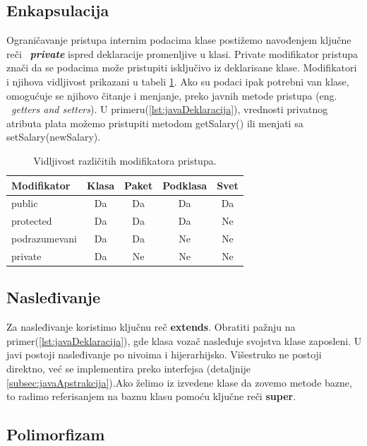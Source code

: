 \documentclass[a4paper]{article}
\begin{document}
{\subsection{Enkapsulacija}
\label{subsec:javaEnkapsulacija}

Ograničavanje pristupa internim podacima klase postižemo navođenjem ključne reči ~{\em \textbf{private}} ispred deklaracije promenljive u klasi. Private modifikator pristupa znači da se podacima može pristupiti isključivo iz deklarisane klase. Modifikatori i njihova vidljivost prikazani u tabeli \ref{tab:tabelaModPristupa}. Ako su podaci ipak potrebni van klase, omogućuje se njihovo čitanje i menjanje, preko javnih metode pristupa (eng. ~{\em getters and setters})\cite{horstmann2017core}. U primeru(\ref{lst:javaDeklaracija}), vrednosti privatnog atributa plata možemo pristupiti metodom getSalary() ili menjati sa setSalary(newSalary).

\begin{table}[h!]
\begin{center}
\caption{Vidljivost različitih modifikatora pristupa.}
\begin{tabular}{|l|c|c|c|c|} \hline
Modifikator &Klasa &Paket &Podklasa &Svet\\ \hline
public &Da &Da &Da &Da\\ \hline
protected &Da &Da &Da &Ne\\ \hline
podrazumevani &Da &Da &Ne &Ne\\ \hline
private &Da &Ne &Ne &Ne\\ \hline
\end{tabular}
\label{tab:tabelaModPristupa}
\end{center}
\end{table}

\subsection{Nasleđivanje}
\label{subsec:javaNasledjivanje}

Za nasleđivanje koristimo ključnu reč \textbf{extends}. Obratiti pažnju na primer(\ref{lst:javaDeklaracija}), gde klasa vozač nasleđuje svojstva klase zaposleni. U javi postoji nasleđivanje po nivoima i hijerarhijsko. Višestruko ne postoji direktno\cite{oopJava}, već se implementira preko interfejsa (detaljnije \ref{subsec:javaApstrakcija}).Ako želimo iz izvedene klase da zovemo metode bazne, to radimo referisanjem na baznu klasu pomoću ključne reči \textbf{super}.

\subsection{Polimorfizam}
\label{subsec:javaPolimorfizam}

}
\end{document}
